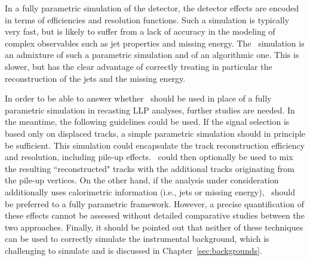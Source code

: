 In a fully parametric simulation of the detector, the detector effects are encoded in
terms of efficiencies and resolution functions. Such a simulation is
typically very fast, but is likely to suffer from a lack of accuracy in the
modeling of complex observables such as jet properties and missing energy. The
\DEL\ simulation is an admixture of such a parametric simulation and of an
algorithmic one. This is slower, but has the clear advantage of correctly
treating in particular the reconstruction of the jets and the missing energy.

In order to be able to answer whether \DEL\ should be used in place of a fully
parametric simulation in recasting LLP analyses,
further studies are needed. In the meantime, the following guidelines could be
used. If the signal selection is based only on displaced tracks, a simple
parametric simulation should in principle be sufficient. This simulation could encapsulate the
track reconstruction efficiency and resolution, including pile-up effects. \DEL\
could then optionally be used to mix the resulting ``reconstructed" tracks with the additional tracks originating from the pile-up vertices.
On the other hand, if the analysis under consideration additionally uses
calorimetric information (i.e., jets or missing energy), \DEL\ should be
preferred to a fully parametric framework. However, a precise
quantification of these effects cannot be assessed without detailed comparative
studies between the two approaches. Finally, it should be pointed out that
neither of these techniques can be used to correctly simulate the instrumental background,
which is challenging to simulate and is discussed in Chapter~\ref{sec:backgrounds}.


